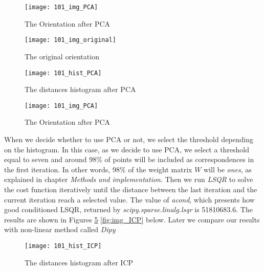 \documentclass[../structure.tex]{subfiles}
\begin{document}
\begin{figure}[h!]
\centering
\texttt{[image: 101\_img\_PCA]}
\captionsetup{justification=centering}
\caption{The Orientation after PCA}
\label{fig:img_PCA}
\end{figure}
\vspace{4em}

\begin{figure}[h!]
\centering
\texttt{[image: 101\_img\_original]}
\captionsetup{justification=centering}
\caption{The original orientation}
\label{fig:img_original}
\end{figure}


\pagebreak
\vspace{4em}
\begin{figure}[h!]
\centering
\texttt{[image: 101\_hist\_PCA]}
\captionsetup{justification=centering}
\caption{The distances histogram after PCA}
\label{fig:hist_PCA}
\end{figure}

\begin{figure}[h!]
\centering
\texttt{[image: 101\_img\_PCA]}
\captionsetup{justification=centering}
\caption{The Orientation after PCA}
\label{fig:img_PCA}
\end{figure}
\vspace{4em}
\pagebreak
When we decide whether to use PCA or not, we select the threshold depending on the histogram. In this case, as we decide to use PCA, we select a threshold equal to seven and around 98\% of points will be included as correspondences in the first iteration. In other words, 98\% of the weight matrix $W$ will be \textit{ones}, as explained in chapter \textit{Methods and implementation}. Then we run \textit{LSQR} to solve the cost function iteratively until the distance between the last iteration and the current iteration reach a selected value. The value of \textit{acond}, which presents how good conditioned LSQR, returned by \textit{scipy.sparse.linalg.lsqr} is 51810683.6. The results are shown in Figures \ref{fig:hist_ICP} \ref{fig:img_ICP} below. Later we compare our results with non-linear method called \textit{Dipy} 

\begin{figure}[h!]
\centering
\texttt{[image: 101\_hist\_ICP]}
\captionsetup{justification=centering}
\caption{The distances histogram after ICP}
\label{fig:hist_ICP}
\end{figure}
\end{document}
